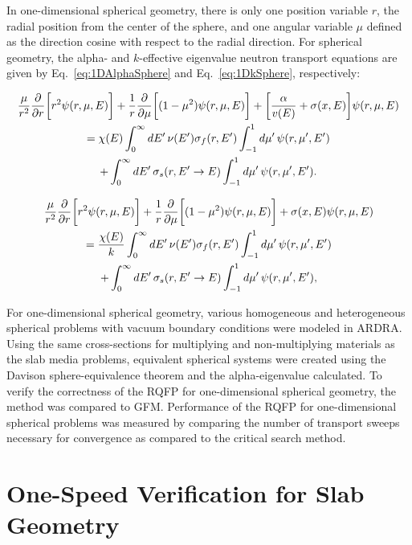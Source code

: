 In one-dimensional spherical geometry, there is only one position variable $r$, the radial position from the center of the sphere, and one angular variable $\mu$ defined as the direction cosine with respect to the radial direction. For spherical geometry, the alpha- and $k$-effective eigenvalue neutron transport equations are given by Eq.~\ref{eq:1DAlphaSphere} and Eq.~\ref{eq:1DkSphere}, respectively:

\begin{multline}
\frac{\mu}{r^{2}} \frac{\partial}{\partial r} \bigg [r^{2} \psi(r,\mu,E) \bigg ] + \frac{1}{r} \frac{\partial}{\partial \mu} \bigg [(1-\mu^{2})\psi(r,\mu,E) \bigg ]+ \bigg [ \frac{\alpha}{v(E)} + \sigma(x,E) \bigg ] \psi(r,\mu,E) \\ = \chi(E) \int_{0}^{\infty} \mathop{}\!d E' \, \nu(E') \sigma_{f}(r,E') \int_{-1}^{1} \mathop{}\!d \mu' \, \psi(r,\mu',E') \\ + \int_{0}^{\infty} \mathop{}\!d E' \, \sigma_{s}(r, E' \rightarrow E) \int_{-1}^{1} \mathop{}\!d \mu' \, \psi(r,\mu',E').
\label{eq:1DkSphere}
\end{multline}

\begin{multline}
\frac{\mu}{r^{2}} \frac{\partial}{\partial r} \bigg [r^{2} \psi(r,\mu,E) \bigg ] + \frac{1}{r} \frac{\partial}{\partial \mu} \bigg [(1-\mu^{2})\psi(r,\mu,E) \bigg ]+ \sigma(x,E) \psi(r,\mu,E) \\ = \frac{\chi(E)}{k} \int_{0}^{\infty} \mathop{}\!d E' \, \nu(E') \sigma_{f}(r,E') \int_{-1}^{1} \mathop{}\!d \mu' \, \psi(r,\mu',E') \\ + \int_{0}^{\infty} \mathop{}\!d E' \, \sigma_{s}(r, E' \rightarrow E) \int_{-1}^{1} \mathop{}\!d \mu' \, \psi(r,\mu',E'),
\label{eq:1DAlphaSphere}
\end{multline}

For one-dimensional spherical geometry, various homogeneous and heterogeneous spherical problems with vacuum boundary conditions were modeled in ARDRA. Using the same cross-sections for multiplying and non-multiplying materials as the slab media problems, equivalent spherical systems were created using the Davison sphere-equivalence theorem \cite{davison1957neutron} and the alpha-eigenvalue calculated. To verify the correctness of the RQFP for one-dimensional spherical geometry, the method was compared to GFM. Performance of the RQFP for one-dimensional spherical problems was measured by comparing the number of transport sweeps necessary for convergence as compared to the critical search method.

\section{One-Speed Verification for Slab Geometry}

